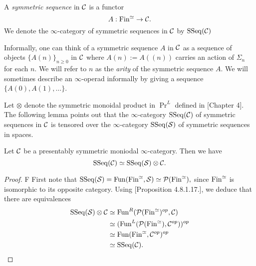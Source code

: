 \begin{definition}
	A \emph{symmetric sequence} in ${\mathcal{C}}$ is a functor 
	$$
	A:\operatorname{Fin}^{\simeq} \to {\mathcal{C}}.
	$$ We denote the $\infty$-category of symmetric sequences in ${\mathcal{C}}$ by $\operatorname{SSeq}({\mathcal{C}})$
\end{definition}
\begin{remark}
	Informally, one can think of a symmetric sequence $A$ in ${\mathcal{C}}$ as a sequence of objects $\{A(n)\}_{n\geq 0}$ in ${\mathcal{C}}$ where $A(n):= A((n))$ carries an action of $\Sigma_n$ for each $n$.
	We will refer to $n$ as the \emph{arity} of the symmetric sequence $A$. We will sometimes describe an $\infty$-operad informally by giving a sequence $\{A(0), A(1), \dots \}$.
	
\end{remark}
Let $\otimes$ denote the symmetric monoidal product in $\Pr^L$ defined in \cite{HA}[Chapter 4]. The following lemma points out that the $\infty$-category $\operatorname{SSeq}({\mathcal{C}})$ of symmetric sequences in ${\mathcal{C}}$ is tensored over the $\infty$-category $\operatorname{SSeq}(\operatorname{\mathcal{S}})$ of symmetric sequences in spaces.
\begin{lemma}
	 Let ${\mathcal{C}}$ be a presentably symmetric moniodal $\infty$-category.
	Then we have 
	$$
	\operatorname{SSeq}({\mathcal{C}}) \simeq \operatorname{SSeq}(\operatorname{\mathcal{S}})\otimes {\mathcal{C}}.
	$$
\end{lemma}
\begin{proof}F
First note that 
$
\operatorname{SSeq}(\operatorname{\mathcal{S}})=\operatorname{Fun}(\operatorname{Fin}^{\simeq}, \operatorname{\mathcal{S}})\simeq {\mathcal{P}}(\operatorname{Fin}^{\simeq}),
$
since $\operatorname{Fin}^{\simeq}$ is isomorphic to its opposite category.
Using \cite{HA}[Proposition 4.8.1.17.], we deduce that there are equivalences
\begin{align*}
	\operatorname{SSeq}(\operatorname{\mathcal{S}})\otimes {\mathcal{C}} 
& \simeq 
\operatorname{Fun}^R({\mathcal{P}}(\operatorname{Fin}^{\simeq})^{op},{\mathcal{C}})\\
&\simeq
(\operatorname{Fun}^{L}({\mathcal{P}}(\operatorname{Fin}^{\simeq}), {\mathcal{C}}^{op}))^{op}\\
& \simeq
\operatorname{Fun}(\operatorname{Fin}^{\simeq},{\mathcal{C}}^{op}) ^{op}\\
& \simeq \operatorname{SSeq}({\mathcal{C}}).
\end{align*}



\end{proof}

%

